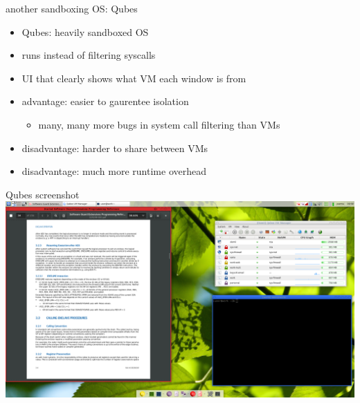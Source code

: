 
\begin{frame}{another sandboxing OS: Qubes}
    \begin{itemize}
    \item Qubes: heavily sandboxed OS
    \item runs  instead of filtering syscalls
    \item UI that clearly shows what VM each window is from
    \vspace{.5cm}
    \item advantage: easier to gaurentee isolation
        \begin{itemize}
        \item many, many more bugs in system call filtering than VMs
        \end{itemize}
    \item disadvantage: harder to share between VMs
    \item disadvantage: much more runtime overhead
    \end{itemize}
\end{frame}

\begin{frame}{Qubes screenshot}
    \includegraphics[width=\textwidth]{../sandbox/qubes-desktop1}
\end{frame}


